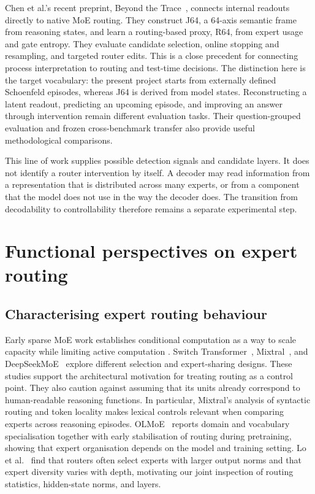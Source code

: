 \documentclass[12pt,a4paper,twoside,openright]{book}
\begin{document}
Chen et al.'s recent preprint, Beyond the Trace~\cite{chen2026beyondtrace},
connects internal readouts directly to native MoE routing. They construct J64,
a 64-axis semantic frame from reasoning states, and learn a routing-based
proxy, R64, from expert usage and gate entropy. They evaluate candidate
selection, online stopping and resampling, and targeted router edits.
This is a close precedent for connecting process interpretation to routing
and test-time decisions. The distinction here is the target vocabulary:
the present project starts from externally defined Schoenfeld episodes,
whereas J64 is derived from model states. Reconstructing a latent readout,
predicting an upcoming episode, and improving an answer through intervention
remain different evaluation tasks. Their question-grouped evaluation and
frozen cross-benchmark transfer also provide useful methodological comparisons.

This line of work supplies possible detection signals and candidate layers.
It does not identify a router intervention by itself. A decoder may read
information from a representation that is distributed across many experts,
or from a component that the model does not use in the way the decoder does.
The transition from decodability to controllability therefore remains a
separate experimental step.

\section{Functional perspectives on expert routing}
\label{sec:related-routing}

\subsection{Characterising expert routing behaviour}

Early sparse MoE work establishes conditional computation as a way to scale
capacity while limiting active computation \cite{shazeer2017sparselygated}.
Switch Transformer~\cite{fedus2022switch}, Mixtral~\cite{jiang2024mixtral}, and
DeepSeekMoE~\cite{dai2024deepseekmoe} explore different selection and
expert-sharing designs.
These studies support the architectural motivation for treating routing as a
control point. They also caution against assuming that its units already
correspond to human-readable reasoning functions. In particular, Mixtral's
analysis of syntactic routing and token locality makes lexical controls
relevant when comparing experts across reasoning episodes.
OLMoE~\cite{muennighoff2025olmoe} reports domain and vocabulary specialisation
together with early stabilisation of routing during pretraining,
showing that expert organisation depends on the model and training setting.
Lo et al.~\cite{lo2025closer} find that routers often select experts with
larger output norms and that expert diversity varies with depth, motivating
our joint inspection of routing statistics, hidden-state norms, and layers.
\end{document}
